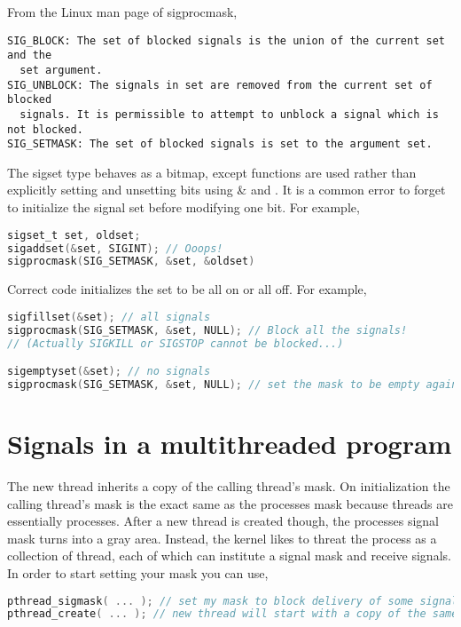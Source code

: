 From the Linux man page of sigprocmask,

\begin{verbatim}
SIG_BLOCK: The set of blocked signals is the union of the current set and the 
  set argument.
SIG_UNBLOCK: The signals in set are removed from the current set of blocked 
  signals. It is permissible to attempt to unblock a signal which is not blocked.
SIG_SETMASK: The set of blocked signals is set to the argument set.
\end{verbatim}

The sigset type behaves as a bitmap, except functions are used rather than explicitly setting and unsetting bits using \& and \textbar{}. It is a common error to forget to initialize the signal set before modifying one bit. For example,

\begin{lstlisting}[language=C]
sigset_t set, oldset;
sigaddset(&set, SIGINT); // Ooops!
sigprocmask(SIG_SETMASK, &set, &oldset)
\end{lstlisting}

Correct code initializes the set to be all on or all off. For example,

\begin{lstlisting}[language=C]
sigfillset(&set); // all signals
sigprocmask(SIG_SETMASK, &set, NULL); // Block all the signals!
// (Actually SIGKILL or SIGSTOP cannot be blocked...)

sigemptyset(&set); // no signals 
sigprocmask(SIG_SETMASK, &set, NULL); // set the mask to be empty again
\end{lstlisting}


\section{Signals in a multithreaded program}

The new thread inherits a copy of the calling thread's mask. On initialization the calling thread's mask is the exact same as the processes mask because threads are essentially processes. After a new thread is created though, the processes signal mask turns into a gray area. Instead, the kernel likes to threat the process as a collection of thread, each of which can institute a signal mask and receive signals. In order to start setting your mask you can use,

\begin{lstlisting}[language=C]
pthread_sigmask( ... ); // set my mask to block delivery of some signals
pthread_create( ... ); // new thread will start with a copy of the same mask
\end{lstlisting}

